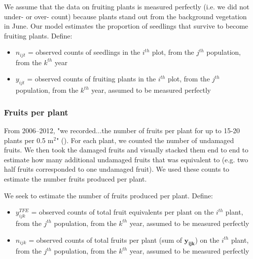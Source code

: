 \documentclass[12pt, oneside, titlepage]{article}   	%
\begin{document}
We assume that the data on fruiting plants is measured perfectly (i.e. we did not under- or over- count) because plants stand out from the background vegetation in June. Our model estimates the proportion of seedlings that survive to become fruiting plants. Define:

\begin{itemize}
	\item $n_{ijt}$ = observed counts of seedlings in the $i^{th}$ plot, from the $j^{th}$ population, from the $k^{th}$ year
	\item $y_{ijt}$ = observed counts of fruiting plants in the $i^{th}$ plot, from the $j^{th}$ population, from the $k^{th}$ year, assumed to be measured perfectly
\end{itemize}

\subsubsection*{Fruits per plant}

From 2006--2012, "we recorded...the number of fruits per plant for up to 15-20 plants per 0.5 m$^2$" (\cite{eckhart2011}). For each plant, we counted the number of undamaged fruits. We then took the damaged fruits and visually stacked them end to end to estimate how many additional undamaged fruits that was equivalent to (e.g. two half fruits corresponded to one undamaged fruit). We used these counts to estimate the number fruits produced per plant. 


We seek to estimate the number of fruits produced per plant. Define: 

\begin{itemize}

	\item $y^{TFE}_{ijk}$ = observed counts of total fruit equivalents per plant on the $i^{th}$ plant, from the $j^{th}$ population, from the $k^{th}$ year, assumed to be measured perfectly
	\item $n_{ijk}$ = observed counts of total fruits per plant (sum of $\bm{y_{ijk}}$) on the $i^{th}$ plant, from the $j^{th}$ population, from the $k^{th}$ year, assumed to be measured perfectly
\end{itemize}
\end{document}

